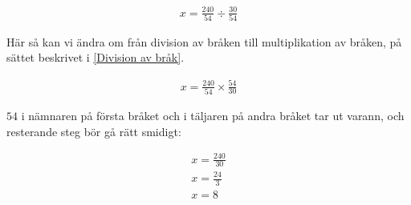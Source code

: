\begin{align}
	x = \frac{240}{54} \div \frac{30}{54}
\end{align}

Här så kan vi ändra om från division av bråken till multiplikation av bråken, på sättet beskrivet i \ref{Division av bråk}.

\begin{align}
	x = \frac{240}{54} \times \frac{54}{30}
\end{align}

$54$ i nämnaren på första bråket och i täljaren på andra bråket tar ut varann, och resterande steg bör gå rätt smidigt:

\begin{align}
	x = \frac{240}{30} \\
	x = \frac{24}{3} \\
	x = 8
\end{align}



























































